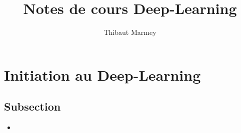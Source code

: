 \documentclass[12pt,a4paper]{article}
\author{Thibaut Marmey}
\title{Notes de cours Deep-Learning}
\begin{document}
	\maketitle

\begin{normalsize}
\tableofcontents
\end{normalsize}

\section{Initiation au Deep-Learning}
\subsection{Subsection}
\begin{itemize}
\item 
\end{itemize}
\end{document}
